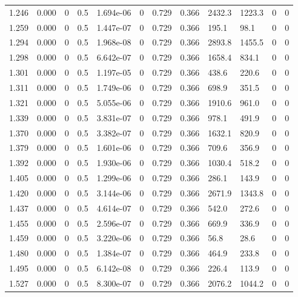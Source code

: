 \documentclass[preview]{standalone}
\begin{document}
{{{\begin{tabular}{L{1.2cm}C{1.2cm} C{0.3cm}C{0.5cm} C{1.4cm}C{1.4cm} C{1.4cm}C{1.4cm} C{1.6cm}C{1.6cm} C{1.6cm}C{1.6cm}}
  1.246  &  0.000  & 0     & 0.5 &  1.694e-06  & 0  &  0.729&   0.366& 2432.3 & 1223.3   &  0 & 0  \\ 
  1.259  &  0.000  & 0     & 0.5 &  1.447e-07  & 0  &  0.729&   0.366& 195.1 & 98.1   &  0 & 0  \\ 
  1.294  &  0.000  & 0     & 0.5 &  1.968e-08  & 0  &  0.729&   0.366& 2893.8 & 1455.5   &  0 & 0  \\ 
  1.298  &  0.000  & 0     & 0.5 &  6.642e-07  & 0  &  0.729&   0.366& 1658.4 & 834.1   &  0 & 0  \\ 
  1.301  &  0.000  & 0     & 0.5 &  1.197e-05  & 0  &  0.729&   0.366& 438.6 & 220.6   &  0 & 0  \\ 
  1.311  &  0.000  & 0     & 0.5 &  1.749e-06  & 0  &  0.729&   0.366& 698.9 & 351.5   &  0 & 0  \\ 
  1.321  &  0.000  & 0     & 0.5 &  5.055e-06  & 0  &  0.729&   0.366& 1910.6 & 961.0   &  0 & 0  \\ 
  1.339  &  0.000  & 0     & 0.5 &  3.831e-07  & 0  &  0.729&   0.366& 978.1 & 491.9   &  0 & 0  \\ 
  1.370  &  0.000  & 0     & 0.5 &  3.382e-07  & 0  &  0.729&   0.366& 1632.1 & 820.9   &  0 & 0  \\ 
  1.379  &  0.000  & 0     & 0.5 &  1.601e-06  & 0  &  0.729&   0.366& 709.6 & 356.9   &  0 & 0  \\ 
  1.392  &  0.000  & 0     & 0.5 &  1.930e-06  & 0  &  0.729&   0.366& 1030.4 & 518.2   &  0 & 0  \\ 
  1.405  &  0.000  & 0     & 0.5 &  1.299e-06  & 0  &  0.729&   0.366& 286.1 & 143.9   &  0 & 0  \\ 
  1.420  &  0.000  & 0     & 0.5 &  3.144e-06  & 0  &  0.729&   0.366& 2671.9 & 1343.8   &  0 & 0  \\ 
  1.437  &  0.000  & 0     & 0.5 &  4.614e-07  & 0  &  0.729&   0.366& 542.0 & 272.6   &  0 & 0  \\ 
  1.455  &  0.000  & 0     & 0.5 &  2.596e-07  & 0  &  0.729&   0.366& 669.9 & 336.9   &  0 & 0  \\ 
  1.459  &  0.000  & 0     & 0.5 &  3.220e-06  & 0  &  0.729&   0.366& 56.8 & 28.6   &  0 & 0  \\ 
  1.480  &  0.000  & 0     & 0.5 &  1.384e-07  & 0  &  0.729&   0.366& 464.9 & 233.8   &  0 & 0  \\ 
  1.495  &  0.000  & 0     & 0.5 &  6.142e-08  & 0  &  0.729&   0.366& 226.4 & 113.9   &  0 & 0  \\ 
  1.527  &  0.000  & 0     & 0.5 &  8.300e-07  & 0  &  0.729&   0.366& 2076.2 & 1044.2   &  0 & 0  \\ 

\end{tabular}}}}
\end{document}
